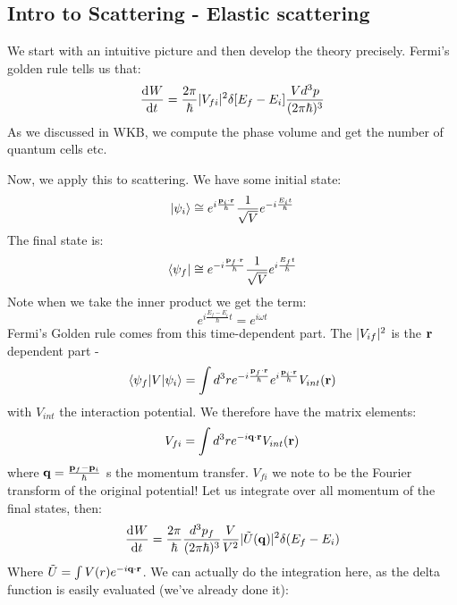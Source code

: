 \subsection{Intro to Scattering - Elastic scattering}
We start with an intuitive picture and then develop the theory precisely. Fermi's golden rule tells us that:
\begin{equation}
    \dod{W}{t} = \frac{2\pi}{\hbar}\abs{V_{fi}}^2 \delta[E_f - E_i]\frac{Vd^3p}{(2\pi\hbar)^3}
\end{equation}
As we discussed in WKB, we compute the phase volume and get the number of quantum cells etc.

Now, we apply this to scattering. We have some initial state:
\begin{equation}
    \lvert \psi_i \rangle \cong e^{i\frac{\mathbf{p}_i \cdot \mathbf{r}}{\hbar}}\frac{1}{\sqrt{V}}e^{-i\frac{E_i t}{\hbar}}
\end{equation}
The final state is:
\begin{equation}
    \langle \psi_f \rvert \cong e^{-i\frac{\mathbf{p}_f \cdot \mathbf{r}}{\hbar}}\frac{1}{\sqrt{V}}e^{i\frac{E_f t}{\hbar}}
\end{equation}
Note when we take the inner product we get the term:
\begin{equation}
    e^{i\frac{E_f - E_i}{\hbar}t} = e^{i\omega t}
\end{equation}
Fermi's Golden rule comes from this time-dependent part. The $\lvert V_{if} \rvert^2$ is the $\mathbf{r}$ dependent part - 
\begin{equation}
    \langle \psi_f \rvert V\lvert \psi_i \rangle = \int d^3r e^{-i\frac{\mathbf{p}_f \cdot \mathbf{r}}{\hbar}}e^{i\frac{\mathbf{p}_i \cdot \mathbf{r}}{\hbar}} V_{int}(\mathbf{r})
\end{equation}
with $V_{int}$ the interaction potential. We therefore have the matrix elements:
\begin{equation}
    V_{fi} = \int d^3r e^{-i\mathbf{q} \cdot \mathbf{r}}V_{int}(\mathbf{r})
\end{equation}
where $\mathbf{q} = \frac{\mathbf{p}_f - \mathbf{p}_i}{\hbar}$ s the momentum transfer. $V_{fi}$ we note to be the Fourier transform of the original potential! Let us integrate over all momentum of the final states, then:
\begin{equation}
    \dod{W}{t} = \frac{2\pi}{\hbar}\frac{d^3p_f}{(2\pi\hbar)^3}\frac{V}{V^2}\abs{\tilde{U}(\v{q})}^2\delta(E_f - E_i)
\end{equation}
Where $\tilde{U} = \int V(r)e^{-i\mathbf{q} \cdot \mathbf{r}}$. We can actually do the integration here, as the delta function is easily evaluated (we've already done it):

